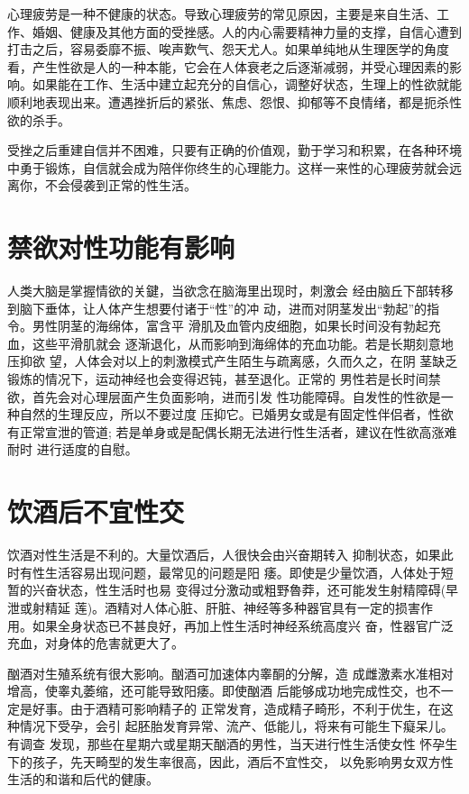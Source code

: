 \documentclass[12pt,UTF8]{ctexbook}
\begin{document}
心理疲劳是一种不健康的状态。导致心理疲劳的常见原因，主要是来自生活、工作、婚姻、健康及其他方面的受挫感。人的内心需要精神力量的支撑，自信心遭到打击之后，容易委靡不振、唉声歎气、怨天尤人。如果单纯地从生理医学的角度看，产生性欲是人的一种本能，它会在人体衰老之后逐渐减弱，并受心理因素的影响。如果能在工作、生活中建立起充分的自信心，调整好状态，生理上的性欲就能顺利地表现出来。遭遇挫折后的紧张、焦虑、怨恨、抑郁等不良情绪，都是扼杀性欲的杀手。

受挫之后重建自信并不困难，只要有正确的价值观，勤于学习和积累，在各种环境中勇于锻炼，自信就会成为陪伴你终生的心理能力。这样一来性的心理疲劳就会远离你，不会侵袭到正常的性生活。

\section{禁欲对性功能有影响}

人类大脑是掌握情欲的关鍵，当欲念在脑海里出现时，刺激会
经由脑丘下部转移到脑下垂体，让人体产生想要付诸于“性”的冲
动，进而对阴茎发出“勃起”的指令。男性阴茎的海绵体，富含平
滑肌及血管内皮细胞，如果长时间没有勃起充血，这些平滑肌就会
逐渐退化，从而影响到海绵体的充血功能。若是长期刻意地压抑欲
望，人体会对以上的刺激模式产生陌生与疏离感，久而久之，在阴
茎缺乏锻炼的情况下，运动神经也会变得迟钝，甚至退化。正常的
男性若是长时间禁欲，首先会对心理层面产生负面影响，进而引发
性功能障碍。自发性的性欲是一种自然的生理反应，所以不要过度
压抑它。已婚男女或是有固定性伴侣者，性欲有正常宣泄的管道;
若是单身或是配偶长期无法进行性生活者，建议在性欲高涨难耐时
进行适度的自慰。

\section{饮酒后不宜性交}

饮酒对性生活是不利的。大量饮酒后，人很快会由兴奋期转入
抑制状态，如果此时有性生活容易出现问题，最常见的问题是阳
痿。即使是少量饮酒，人体处于短暂的兴奋状态，性生活时也易
变得过分激动或粗野魯莽，还可能发生射精障碍(早泄或射精延
莲)。酒精对人体心脏、肝脏、神经等多种器官具有一定的损害作
用。如果全身状态已不甚良好，再加上性生活时神经系统高度兴
奋，性器官广泛充血，对身体的危害就更大了。

酗酒对生殖系统有很大影响。酗酒可加速体内睾酮的分解，造
成雌激素水准相对增高，使睾丸萎缩，还可能导致阳痿。即使酗酒
后能够成功地完成性交，也不一定是好事。由于酒精可影响精子的
正常发育，造成精子畸形，不利于优生，在这种情况下受孕，会引
起胚胎发育异常、流产、低能儿，将来有可能生下癡呆儿。有调查
发现，那些在星期六或星期天酗酒的男性，当天进行性生活使女性
怀孕生下的孩子，先天畸型的发生率很高，因此，酒后不宜性交，
以免影响男女双方性生活的和谐和后代的健康。
\end{document}
